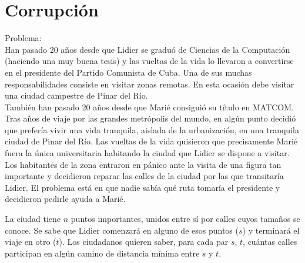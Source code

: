 \documentclass[
10pt, %
a4paper, %
oneside, %
headinclude,footinclude, %
BCOR5mm, %
]{scrartcl}
\begin{document}



\newpage %


\section{Corrupción}

Problema: \\

Han pasado 20 años desde que Lidier se graduó de Ciencias de la Computación  
(haciendo una muy buena tesis) y las vueltas de la vida lo llevaron a convertirse  
en el presidente del Partido Comunista de Cuba. Una de sus muchas responsabilidades  
consiste en visitar zonas remotas. En esta ocasión debe visitar una  
ciudad campestre de Pinar del Río.\\

También han pasado 20 años desde que Marié consiguió su título en MATCOM.  
Tras años de viaje por las grandes metrópolis del mundo, en algún punto  
decidió que prefería vivir una vida tranquila, aislada de la urbanización, en una  
tranquila ciudad de Pinar del Río. Las vueltas de la vida quisieron que precisamente  
Marié fuera la única universitaria habitando la ciudad que Lidier se  
dispone a visitar.\\

Los habitantes de la zona entraron en pánico ante la visita de una figura tan  
importante y decidieron reparar las calles de la ciudad por las que transitaría  
Lidier. El problema está en que nadie sabía qué ruta tomaría el presidente y  
decidieron pedirle ayuda a Marié.

La ciudad tiene $n$ puntos importantes, unidos entre sí por calles cuyos  
tamaños se conoce. Se sabe que Lidier comenzará en alguno de esos puntos  
($s$) y terminará el viaje en otro ($t$). Los ciudadanos quieren saber, para  
cada par $s$, $t$, cuántas calles participan en algún camino de distancia mínima  
entre $s$ y $t$. \\
\end{document}
